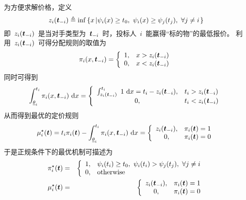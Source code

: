 \documentclass[a4paper,12pt]{article}
\newcommand{\mv}[1]{\mbox{\boldmath$#1$}}         %
\newcommand{\id}{\mathrm{d}}                      %
\begin{document}
为方便求解价格，定义
\begin{equation}\label{mech:payment:intuitive}
    z_i(\mv{t}_{-i}) \triangleq \inf\left\{x\left|\psi_i(x) \ge t_0,~\psi_i(x)
                     \ge \psi_j(t_j),~\forall j\neq i\right.\right\}
\end{equation}
即~$z_i(\mv{t}_{-i})$~是当对手类型为~$\mv{t}_{-i}$~时，投标人~$i$~能赢得``标的物''的最低报价。
利用~$z_i(\mv{t}_{-i})$~可得分配规则的取值为
\begin{equation*}
    \pi_i(x,\mv{t}_{-i}) = \left\{
        \begin{array}{cl}
          1, & x > z_i(\mv{t}_{-i}) \\
          0, & x < z_i(\mv{t}_{-i})
        \end{array}
    \right.
\end{equation*}
同时可得到
\begin{equation*}
    \int_{\underline{\theta}_i}^{t_i}\pi_i(x,\mv{t}_{-i})~\id x = \left\{
        \begin{array}{cl}
          \int_{z_i(\textbf{\emph{t}}_{-i})}^{t_i}~1~\id x
             = t_i-z_i(\mv{t}_{-i}), & t_i > z_i(\mv{t}_{-i}) \\
          0, & t_i < z_i(\textbf{\emph{t}}_{-i})
        \end{array}
    \right.
\end{equation*}
从而得到最优的定价规则
\begin{equation}\label{mech:definition:optimal:payment}
    \mu_i^\star(\mv{t}) = t_i\pi_i(\mv{t}) - \int_{\underline{\theta}_i}^{t_i}\pi_i(x,\mv{t}_{-i})~\id x
                        = \left\{
        \begin{array}{cl}
          z_i(\mv{t}_{-i}), & \pi_i(\mv{t}) = 1 \\
          0, & \pi_i(\mv{t}) = 0
        \end{array}
    \right.
\end{equation}
于是正规条件下的最优机制可描述为
\begin{eqnarray*}
  \pi_i^\star(\mv{t}) &=& \left\{
        \begin{array}{cl}
          1, & \psi_i(t_i) \ge t_0,~\psi_i(t_i) > \psi_j(t_j),~\forall j\neq i \\
          0, & \mathrm{otherwise}
        \end{array}
  \right. \\
  \mu_i^\star(\mv{t}) &=& \left\{
        \begin{array}{cl}
          z_i(\mv{t}_{-i}), & \pi_i(\mv{t}) = 1 \\
          0, & \pi_i(\mv{t}) = 0
        \end{array}
  \right.
\end{eqnarray*}
\end{document}
